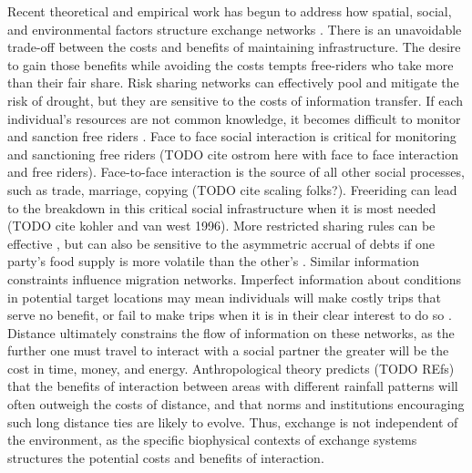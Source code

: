 \documentclass[11pt]{wlscirep}
\begin{document}
Recent theoretical and empirical work has begun to address how spatial, social, and environmental factors structure exchange networks \cite{Nolin2010Food-SharingIndonesia,Koster2014,Hao2015,Schnegg2015}. There is an unavoidable trade-off between the costs and benefits of maintaining infrastructure. The desire to gain those benefits while avoiding the costs tempts free-riders who take more than their fair share. Risk sharing networks can effectively pool and mitigate the risk of drought, but they are sensitive to the costs of information transfer. If each individual's resources are not common knowledge, it becomes difficult to monitor and sanction free riders \cite{Hao2015a}. Face to face social interaction is critical for monitoring and sanctioning free riders (TODO cite ostrom here with face to face interaction and free riders). Face-to-face interaction is the source of all other social processes, such as trade, marriage, copying (TODO cite scaling folks?). Freeriding can lead to the breakdown in this critical social infrastructure when it is most needed (TODO cite kohler and van west 1996). More restricted sharing rules can be effective \cite{Hegmon1996}, but can also be sensitive to the asymmetric accrual of debts if one party's food supply is more volatile than the other's \cite{Crabtree2015}. Similar information constraints influence migration networks. Imperfect information about conditions in potential target locations may mean individuals will make costly trips that serve no benefit, or fail to make trips when it is in their clear interest to do so \cite{Anderies2011a}. Distance ultimately constrains the flow of information on these networks, as the further one must travel to interact with a social partner the greater will be the cost in time, money, and energy. Anthropological theory predicts (TODO REfs) that the benefits of interaction between areas with different rainfall patterns will often outweigh the costs of distance, and that norms and institutions encouraging such long distance ties are likely to evolve. Thus, exchange is not independent of the environment, as the specific biophysical contexts of exchange systems structures the potential costs and benefits of interaction.
\end{document}
